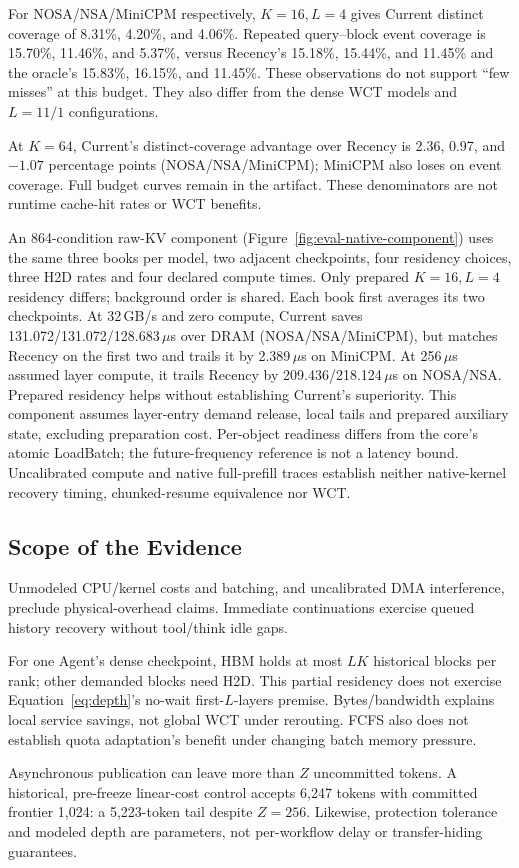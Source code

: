 For NOSA/NSA/MiniCPM respectively, $K=16,L=4$ gives Current distinct coverage
of 8.31\%, 4.20\%, and 4.06\%. Repeated query--block event coverage is
15.70\%, 11.46\%, and 5.37\%, versus Recency's 15.18\%, 15.44\%, and 11.45\%
and the oracle's 15.83\%, 16.15\%, and 11.45\%. These observations do not
support ``few misses'' at this budget. They also differ from the dense WCT
models and $L=11/1$ configurations.

At $K=64$, Current's distinct-coverage advantage over Recency is
2.36, 0.97, and $-1.07$ percentage points (NOSA/NSA/MiniCPM);
MiniCPM also loses on event coverage. Full budget curves remain in the artifact.
These denominators are not runtime cache-hit rates or WCT benefits.

An 864-condition raw-KV component (Figure~\ref{fig:eval-native-component})
uses the same three books per model,
two adjacent checkpoints, four residency choices, three H2D rates and four
declared compute times. Only prepared $K=16,L=4$ residency differs;
background order is shared. Each book first averages its two checkpoints.
At 32\,GB/s and zero compute, Current saves 131.072/131.072/128.683\,$\mu$s
over DRAM (NOSA/NSA/MiniCPM), but matches Recency on the first two and
trails it by 2.389\,$\mu$s on MiniCPM. At 256\,$\mu$s assumed layer compute,
it trails Recency by 209.436/218.124\,$\mu$s on NOSA/NSA.
Prepared residency helps without establishing Current's superiority.
This component assumes layer-entry demand release, local tails and prepared
auxiliary state, excluding preparation cost. Per-object readiness differs
from the core's atomic LoadBatch; the future-frequency reference is not a
latency bound. Uncalibrated compute and native full-prefill traces establish
neither native-kernel recovery timing, chunked-resume equivalence nor WCT.

\subsection{Scope of the Evidence}
\label{sec:eval-limits}
Unmodeled CPU/kernel costs and batching, and uncalibrated DMA interference,
preclude physical-overhead claims. Immediate continuations exercise queued
history recovery without tool/think idle gaps.

For one Agent's dense checkpoint, HBM holds at most $LK$ historical blocks per
rank; other demanded blocks need H2D. This partial residency does not exercise
Equation~\ref{eq:depth}'s no-wait first-$L$-layers premise. Bytes/bandwidth
explains local service savings, not global WCT under rerouting. FCFS also
does not establish quota adaptation's benefit under changing batch memory pressure.

Asynchronous publication can leave more than $Z$ uncommitted tokens.
A historical, pre-freeze linear-cost control accepts 6,247 tokens with
committed frontier 1,024: a 5,223-token tail despite $Z=256$.
Likewise, protection tolerance and modeled depth are parameters, not
per-workflow delay or transfer-hiding guarantees.
